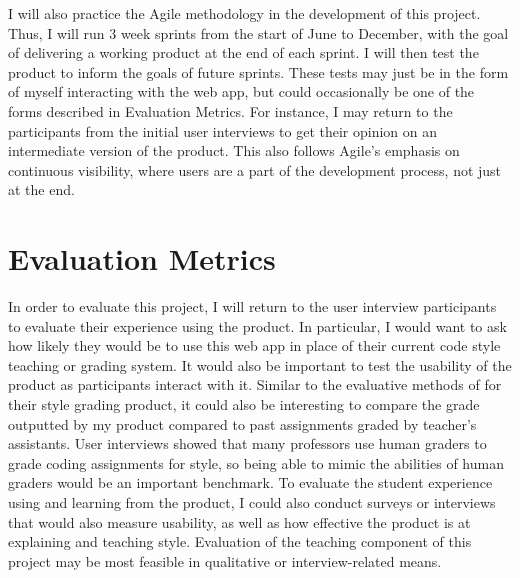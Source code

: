 \documentclass[10pt,twocolumn]{article}
\begin{document}
I will also practice the Agile methodology in the development of this project. Thus, I will run 3 week sprints from the start of June to December, with the goal of delivering a working product at the end of each sprint. I will then test the product to inform the goals of future sprints. These tests may just be in the form of myself interacting with the web app, but could occasionally be one of the forms described in Evaluation Metrics. For instance, I may return to the participants from the initial user interviews to get their opinion on an intermediate version of the product. This also follows Agile's emphasis on continuous visibility, where users are a part of the development process, not just at the end. 

\section{Evaluation Metrics}
In order to evaluate this project, I will return to the user interview participants to evaluate their experience using the product. In particular, I would want to ask how likely they would be to use this web app in place of their current code style teaching or grading system. It would also be important to test the usability of the product as participants interact with it. Similar to the evaluative methods of \cite{moghadam_2015} for their style grading product, it could also be interesting to compare the grade outputted by my product compared to past assignments graded by teacher’s assistants. User interviews showed that many professors use human graders to grade coding assignments for style, so being able to mimic the abilities of human graders would be an important benchmark. To evaluate the student experience using and learning from the product, I could also conduct surveys or interviews that would also measure usability, as well as how effective the product is at explaining and teaching style. Evaluation of the teaching component of this project may be most feasible in qualitative or interview-related means.
\end{document}
